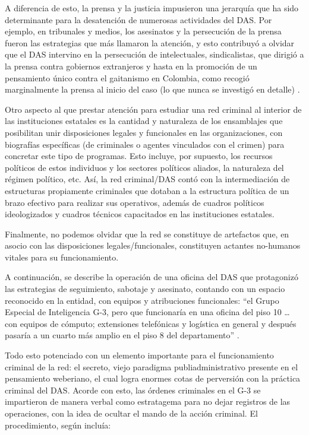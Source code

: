 \documentclass[
  spanish,
  11pt,
  a4paper,
]{scrbook}
\begin{document}
A diferencia de esto, la prensa y la justicia impusieron una jerarquía
que ha sido determinante para la desatención de numerosas actividades
del DAS. Por ejemplo, en tribunales y medios, los asesinatos y la
persecución de la prensa fueron las estrategias que más llamaron la
atención, y esto contribuyó a olvidar que el DAS intervino en la
persecución de intelectuales, sindicalistas, que dirigió a la prensa
contra gobiernos extranjeros y hasta en la promoción de un pensamiento
único contra el gaitanismo en Colombia, como recogió marginalmente la
prensa al inicio del caso (lo que nunca se investigó en detalle)
\autocite{Coronell2010}.

Otro aspecto al que prestar atención para estudiar una red criminal al
interior de las instituciones estatales es la cantidad y naturaleza de
los ensamblajes que posibilitan unir disposiciones legales y funcionales
en las organizaciones, con biografías específicas (de criminales o
agentes vinculados con el crimen) para concretar este tipo de programas.
Esto incluye, por supuesto, los recursos políticos de estos individuos y
los sectores políticos aliados, la naturaleza del régimen político, etc.
Así, la red criminal/DAS contó con la intermediación de estructuras
propiamente criminales que dotaban a la estructura política de un brazo
efectivo para realizar sus operativos, además de cuadros políticos
ideologizados y cuadros técnicos capacitados en las instituciones
estatales.

Finalmente, no podemos olvidar que la red se constituye de artefactos
que, en asocio con las disposiciones legales/funcionales, constituyen
actantes no-humanos vitales para su funcionamiento.

A continuación, se describe la operación de una oficina del DAS que
protagonizó las estrategias de seguimiento, sabotaje y asesinato,
contando con un espacio reconocido en la entidad, con equipos y
atribuciones funcionales: ``el Grupo Especial de Inteligencia G-3, pero
que funcionaría en una oficina del piso 10 \ldots{} con equipos de
cómputo; extensiones telefónicas y logística en general y después
pasaría a un cuarto más amplio en el piso 8 del departamento''
\autocite[33-34]{Martinez2016}.

Todo esto potenciado con un elemento importante para el funcionamiento
criminal de la red: el secreto, viejo paradigma publiadministrativo
presente en el pensamiento weberiano, el cual logra enormes cotas de
perversión con la práctica criminal del DAS. Acorde con esto, las
órdenes criminales en el G-3 se impartieron de manera verbal como
estratagema para no dejar registros de las operaciones, con la idea de
ocultar el mando de la acción criminal. El procedimiento, según
\autocite{Martinez2016} incluía:
\end{document}
